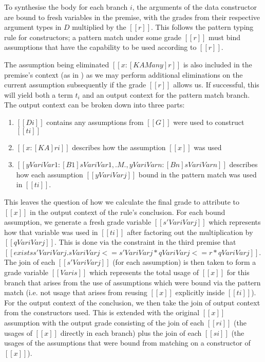 To synthesise the body for each branch $i$, the arguments of the
data constructor are bound to fresh variables in the premise,
with the grades from their respective argument types in $D$ multiplied by the
$[[ r ]]$. This follows the pattern typing rule for constructors; a pattern
match under some grade $[[ r ]]$ must bind assumptions that have the capability
to be used according to $[[ r ]]$.

The assumption being eliminated
$[[ x : [K {A Many}] r ]]$ is also included in the premise's context (as in \GRANULEdruleAppName) as we may perform
additional eliminations on the current assumption subsequently if the grade
$[[ r ]]$ allows us. If successful,
this will yield both a term $t_{i}$ and an output context for the
pattern match branch.
The output context can be broken down into three parts:
\begin{enumerate}
\item $[[ Di ]]$ contains any
assumptions from $[[ G ]]$ were used to construct $[[ ti ]]$
\item  $[[ x : [K A] ri ]]$ describes how the assumption $[[ x ]]$ was
used
\item $[[ {{y Vari Var1} : [B1] {s Vari Var1} } , .M. , {y Vari Varn} : [Bn] {s Vari Varn} ]]$ describes how each assumption  $[[ y Vari Varj ]]$ bound in the pattern
match was used in $[[ ti ]]$.
\end{enumerate}
%
This leaves the question of how we calculate the final grade to
attribute to $ [[ x ]]$  in the output context of the rule's conclusion.
For each bound assumption, we generate a fresh grade variable
$[[ s' Vari Varj  ]]$ which represents how that variable was used in $[[ ti ]]$
after factoring out the multiplication by $[[ q Vari Varj ]]$. This is done via the
constraint in the third premise that $ [[
exists {s' Vari Varj} . {s Vari Varj} <= {s' Vari Varj} * {q Vari Varj} <= r * {q Vari Varj} ]]$.
The join of each $[[ s' Vari Varj ]]$ (for each assumption) is then taken to
form a grade variable $[[ Vari s ]]$ which represents the total usage of
$[[ x ]]$ for this branch that arises from the use of assumptions which were
bound via the pattern match (i.e. not usage that arises from reusing $[[x]]$
explicitly inside $[[ ti ]]$). For the output context of the conclusion, we then
take the join of output context from the constructors used. This is extended
with the original $[[ x ]]$ assumption with the output grade consisting of the
join of each $[[ ri ]]$ (the usages of $[[ x ]]$ directly in each branch) plus
the join of each $[[ si ]]$ (the usages of the assumptions that were bound from
matching on a constructor of $[[ x ]]$).

